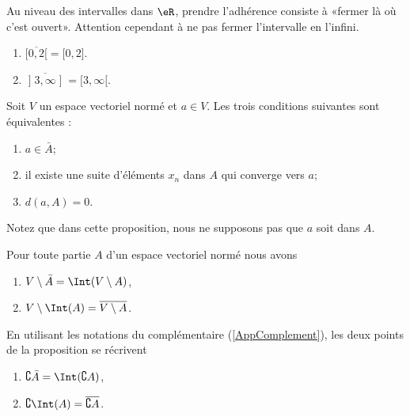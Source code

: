 \begin{example}
	Au niveau des intervalles dans $\eR$, prendre l'adhérence consiste à «fermer là où c'est ouvert». Attention cependant à ne pas fermer l'intervalle en l'infini.
	\begin{enumerate}
		\item
			$\overline{ \mathopen[ 0 , 2 [ }=\mathopen[ 0 , 2 \mathclose]$.
		\item
			$\overline{ \mathopen] 3 , \infty \mathopen] }=\mathopen[ 3 , \infty [$.
	\end{enumerate}
\end{example}

\begin{proposition}
	Soit $V$ un espace vectoriel normé et $a\in V$. Les trois conditions suivantes sont équivalentes :
	\begin{enumerate}
		\item
			$a\in\bar A$;
		\item
			il existe une suite d'éléments $x_n$ dans $A$ qui converge vers $a$;
		\item
			$d(a,A)=0$.
	\end{enumerate}
\end{proposition}
Notez que dans cette proposition, nous ne supposons pas que $a$ soit dans $A$.

\begin{proposition}		\label{PropComleIntBar}
	Pour toute partie $A$ d'un espace vectoriel normé nous avons
	\begin{enumerate}
		\item
			$V\setminus\bar A=\Int(V\setminus A)$,
		\item
			$V\setminus\Int(A)=\overline{ V\setminus A }$.
	\end{enumerate}
\end{proposition}

En utilisant les notations du complémentaire (\ref{AppComplement}), les deux points de la proposition se récrivent
\begin{enumerate}
	\item
		$\complement \bar A=\Int(\complement A)$,
	\item\label{ItemLemPropComplementiv}
		$\complement\Int(A)=\overline{ \complement A }$.
\end{enumerate}

